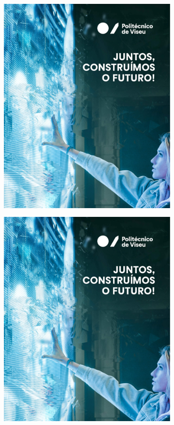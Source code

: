\begin{figure}[!htbp]
\begin{subfigure}{0.3\textwidth}
        \includegraphics[width=\textwidth]{Figuras/tablet1-2022.jpg}
        \caption{}
        \label{fig:juntos2}
    \end{subfigure}
    \hfill
    \begin{subfigure}{0.3\textwidth}
        \centering
        \includegraphics[width=\textwidth]{Figuras/tablet1-2022.jpg}

\end{subfigure}
\end{figure}
